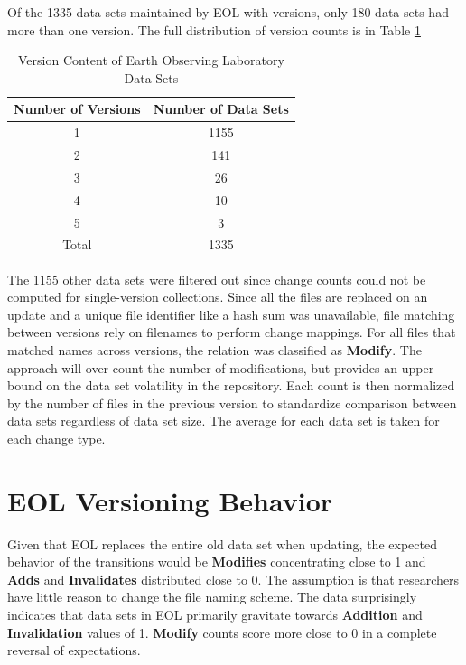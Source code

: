 Of the 1335 data sets maintained by EOL with versions, only 180 data sets had more than one version.  
The full distribution of version counts is in Table \ref{table:EOL_Versions}
\begin{table}
	\caption{Version Content of Earth Observing Laboratory Data Sets}
	\label{table:EOL_Versions}
	\centering
	\begin{tabular}{|c|c|}
		\hline
		Number of Versions& Number of Data Sets\\ \hline
		1&	1155\\
		2&	141\\
		3&	26\\
		4&	10\\
		5&	3\\
		Total&	1335\\
		\hline
	\end{tabular}
\end{table}
The 1155 other data sets were filtered out since change counts could not be computed for single-version collections.
Since all the files are replaced on an update and a unique file identifier like a hash sum was unavailable, file matching between versions rely on filenames to perform change mappings.
For all files that matched names across versions, the relation was classified as \textbf{Modify}.  
The approach will over-count the number of modifications, but provides an upper bound on the data set volatility in the repository.  
Each count is then normalized by the number of files in the previous version to standardize comparison between data sets regardless of data set size.  
The average for each data set is taken for each change type.

\section{EOL Versioning Behavior} \label{sec:behavior}

Given that EOL replaces the entire old data set when updating, the expected behavior of the transitions would be \textbf{Modifies} concentrating close to 1 and \textbf{Adds} and \textbf{Invalidates} distributed close to 0.
The assumption is that researchers have little reason to change the file naming scheme.
The data surprisingly indicates that data sets in EOL primarily gravitate towards \textbf{Addition} and \textbf{Invalidation} values of 1.
\textbf{Modify} counts score more close to 0 in a complete reversal of expectations.

